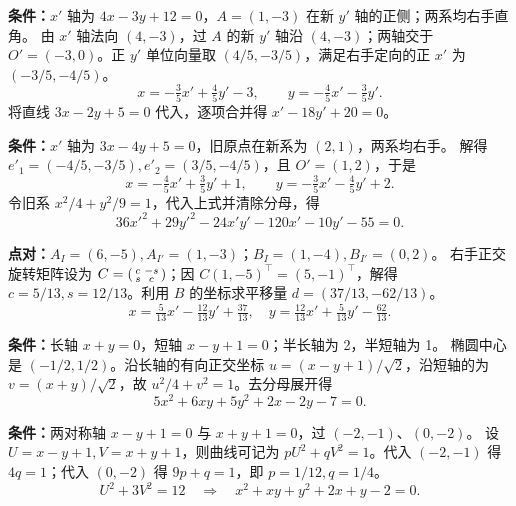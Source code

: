 \textbf{条件：}$x'$ 轴为 $4x-3y+12=0$，$A=(1,-3)$ 在新 $y'$ 轴的正侧；两系均右手直角。
由 $x'$ 轴法向 $(4,-3)$，过 $A$ 的新 $y'$ 轴沿 $(4,-3)$；两轴交于 $O'=(-3,0)$。正 $y'$ 单位向量取 $(4/5,-3/5)$，满足右手定向的正 $x'$ 为 $(-3/5,-4/5)$。
\[
\boxed{x=-\tfrac35x'+\tfrac45y'-3,\qquad y=-\tfrac45x'-\tfrac35y'.}
\]
将直线 $3x-2y+5=0$ 代入，逐项合并得 $x'-18y'+20=0$。

\textbf{条件：}$x'$ 轴为 $3x-4y+5=0$，旧原点在新系为 $(2,1)$，两系均右手。
解得 $e'_1=(-4/5,-3/5),e'_2=(3/5,-4/5)$，且 $O'=(1,2)$，于是
\[
\boxed{x=-\tfrac45x'+\tfrac35y'+1,\qquad y=-\tfrac35x'-\tfrac45y'+2.}
\]
令旧系 $x^2/4+y^2/9=1$，代入上式并清除分母，得
\[\boxed{36x'^2+29y'^2-24x'y'-120x'-10y'-55=0.}\]

\textbf{点对：}$A_I=(6,-5),A_{I'}=(1,-3)$；$B_I=(1,-4),B_{I'}=(0,2)$。
右手正交旋转矩阵设为 $C=\begin{psmallmatrix}c&-s\\s&c\end{psmallmatrix}$；因 $C(1,-5)^\top=(5,-1)^\top$，解得 $c=5/13,s=12/13$。利用 $B$ 的坐标求平移量 $d=(37/13,-62/13)$。
\[
\boxed{x=\tfrac5{13}x'-\tfrac{12}{13}y'+\tfrac{37}{13},\quad
y=\tfrac{12}{13}x'+\tfrac5{13}y'-\tfrac{62}{13}.}
\]

\textbf{条件：}长轴 $x+y=0$，短轴 $x-y+1=0$；半长轴为 2，半短轴为 1。
椭圆中心是 $(-1/2,1/2)$。沿长轴的有向正交坐标 $u=(x-y+1)/\sqrt2$，沿短轴的为 $v=(x+y)/\sqrt2$，故 $u^2/4+v^2=1$。去分母展开得
\[\boxed{5x^2+6xy+5y^2+2x-2y-7=0.}\]

\textbf{条件：}两对称轴 $x-y+1=0$ 与 $x+y+1=0$，过 $(-2,-1)$、$(0,-2)$。
设 $U=x-y+1,V=x+y+1$，则曲线可记为 $pU^2+qV^2=1$。代入 $(-2,-1)$ 得 $4q=1$；代入 $(0,-2)$ 得 $9p+q=1$，即 $p=1/12,q=1/4$。
\[U^2+3V^2=12\quad\Longrightarrow\quad\boxed{x^2+xy+y^2+2x+y-2=0.}\]

